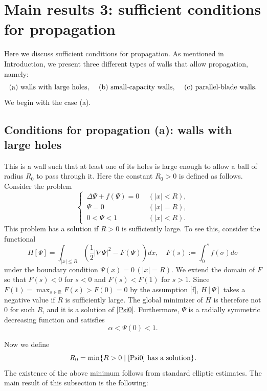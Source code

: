 \documentclass[a4paper,12pt,fullpage]{article}
\numberwithin{equation}{section}
\def\R{{\mathbb R}}
\begin{document}
\section{Main results 3: sufficient conditions for propagation}\label{s:main-propagation}

Here we discuss sufficient conditions for propagation. As mentioned in Introduction, we present three different types of walls that allow propagation, namely: 
\[
\hbox{(a) walls with large holes, \quad
(b) small-capacity walls, \quad (c) parallel-blade walls.}
\]
We begin with the case (a).


\subsection{Conditions for propagation (a): walls with large holes}
\label{ss:main-large-holes}

This is a wall such that at least one of its holes is large enough to allow a ball of radius $R_0$ to pass through it.  Here the constant $R_0>0$ is defined as follows. Consider the problem
\begin{equation}\label{Psi0}
\begin{cases}
\,\Delta \Psi+f(\Psi)=0\ \ &(|x|<R),\\
\,\Psi =0\ \ &(|x|=R),\\
\,0<\Psi<1\ \ &(|x|<R).
\end{cases}
\end{equation}
This problem has a solution if $R>0$ is sufficiently large. To see this, consider the functional
\[
H[\Psi]=\int_{|x|\leq R}\left(\frac12 |\nabla \Psi|^2 - F(\Psi)\right)dx, \quad F(s):=\int_0^s f(\sigma)d\sigma
\]
under the boundary condition $\Psi(x)=0\,(|x|=R)$. We extend the domain of $F$ so that $F(s)<0$ for $s<0$ and $F(s)<F(1)$ for $s>1$. Since $F(1)=\max_{s\in\R} F(s)>F(0)=0$ by the assumption \eqref{f}, $H[\Psi]$ takes a negative value if $R$ is sufficiently large. The global minimizer of $H$ is therefore not $0$ for such $R$, and it is a solution of \eqref{Psi0}.  Furthermore, $\Psi$ is a radially symmetric decreasing function and satisfies
\begin{equation}\label{Psi(0)}
\alpha<\Psi(0)<1.
\end{equation}

Now we define
\begin{equation}\label{R0}
R_0 = \min\{R>0 \mid \hbox{\eqref{Psi0} has a solution} \}.
\end{equation}
The existence of the above minimum follows from standard elliptic estimates. The main result of this subsection is the following:
\end{document}
